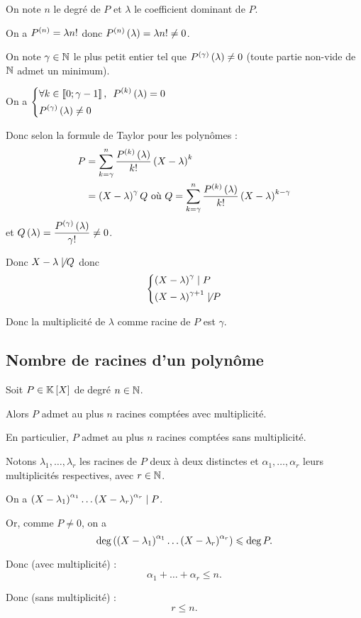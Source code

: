 \begin{dem}
On note \(n\) le degré de \(P\) et \(\lambda\) le coefficient dominant de \(P\).

On a \(P^{\left(n\right)}=\lambda n!\) donc \(P^{\left(n\right)}\left(\lambda\right)=\lambda n!\not=0\).

On note \(\gamma\in\mathbb{N}\) le plus petit entier tel que \(P^{\left(\gamma\right)}\left(\lambda\right)\not=0\) (toute partie non-vide de \(\mathbb{N}\) admet un minimum).

On a \(\begin{dcases}\quantifs{\forall k\in\interventierii{0}{\gamma-1}}P\deriv{k}\paren{\lambda}=0 \\ P\deriv{\gamma}\paren{\lambda}\not=0\end{dcases}\)

Donc selon la formule de Taylor pour les polynômes : \[\begin{aligned}
P&=\sum_{k=\gamma}^n\dfrac{P^{\left(k\right)}\left(\lambda\right)}{k!}\left(X-\lambda\right)^k \\
&=\left(X-\lambda\right)^{\gamma}Q\text{ où }Q=\sum_{k=\gamma}^n\dfrac{P^{\left(k\right)}\left(\lambda\right)}{k!}\left(X-\lambda\right)^{k-\gamma}
\end{aligned}\] et \(Q\left(\lambda\right)=\dfrac{P^{\left(\gamma\right)}\left(\lambda\right)}{\gamma!}\not=0\).

Donc \(X-\lambda\not\mid Q\) donc \[\begin{dcases}\left(X-\lambda\right)^{\gamma}\mid P \\ \left(X-\lambda\right)^{\gamma+1}\not\mid P\end{dcases}\]

Donc la multiplicité de \(\lambda\) comme racine de \(P\) est \(\gamma\).
\end{dem}

\subsection{Nombre de racines d'un polynôme}\label{subsec:nbRacinesPoly}

\begin{prop}
Soit \(P\in\poly\) de degré \(n\in\mathbb{N}\).

Alors \(P\) admet au plus \(n\) racines comptées avec multiplicité.

En particulier, \(P\) admet au plus \(n\) racines comptées sans multiplicité.
\end{prop}

\begin{dem}
Notons \(\lambda_1,\dots,\lambda_r\) les racines de \(P\) deux à deux distinctes et \(\alpha_1,\dots,\alpha_r\) leurs multiplicités respectives, avec \(r\in\mathbb{N}\).

On a \(\left(X-\lambda_1\right)^{\alpha_1}\dots\left(X-\lambda_r\right)^{\alpha_r}\mid P\).

Or, comme \(P\not=0\), on a \[\deg\left(\left(X-\lambda_1\right)^{\alpha_1}\dots\left(X-\lambda_r\right)^{\alpha_r}\right)\leqslant\deg P.\]

Donc (avec multiplicité) : \[\alpha_1+\dots+\alpha_r\leq n.\]

Donc (sans multiplicité) : \[r\leq n.\]
\end{dem}

